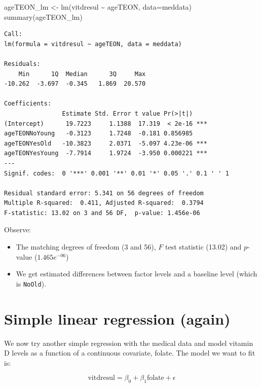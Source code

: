 \documentclass[
  oneside]{krantz}
\newenvironment{Shaded}{\begin{snugshade}}{\end{snugshade}}
\newcommand{\AttributeTok}[1]{\textcolor[rgb]{0.77,0.63,0.00}{#1}}
\newcommand{\FunctionTok}[1]{\textcolor[rgb]{0.00,0.00,0.00}{#1}}
\newcommand{\NormalTok}[1]{#1}
\newcommand{\OtherTok}[1]{\textcolor[rgb]{0.56,0.35,0.01}{#1}}
\newcommand{\SpecialCharTok}[1]{\textcolor[rgb]{0.00,0.00,0.00}{#1}}
\providecommand{\tightlist}{%
  \setlength{\itemsep}{0pt}\setlength{\parskip}{0pt}}
\begin{document}
\begin{Shaded}
\begin{Highlighting}[]
\NormalTok{ageTEON\_lm }\OtherTok{\textless{}{-}} \FunctionTok{lm}\NormalTok{(vitdresul }\SpecialCharTok{\textasciitilde{}}\NormalTok{ ageTEON, }\AttributeTok{data=}\NormalTok{meddata)}
\FunctionTok{summary}\NormalTok{(ageTEON\_lm)}
\end{Highlighting}
\end{Shaded}

\begin{verbatim}
Call:
lm(formula = vitdresul ~ ageTEON, data = meddata)

Residuals:
    Min      1Q  Median      3Q     Max 
-10.262  -3.697  -0.345   1.869  20.570 

Coefficients:
                Estimate Std. Error t value Pr(>|t|)    
(Intercept)      19.7223     1.1388  17.319  < 2e-16 ***
ageTEONNoYoung   -0.3123     1.7248  -0.181 0.856985    
ageTEONYesOld   -10.3823     2.0371  -5.097 4.23e-06 ***
ageTEONYesYoung  -7.7914     1.9724  -3.950 0.000221 ***
---
Signif. codes:  0 '***' 0.001 '**' 0.01 '*' 0.05 '.' 0.1 ' ' 1

Residual standard error: 5.341 on 56 degrees of freedom
Multiple R-squared:  0.411, Adjusted R-squared:  0.3794 
F-statistic: 13.02 on 3 and 56 DF,  p-value: 1.456e-06
\end{verbatim}

Observe:

\begin{itemize}
\tightlist
\item
  The matching degrees of freedom (3 and 56), \(F\) test statistic (13.02) and \(p\)-value (\(1.465e^{-06}\))
\item
  We get estimated differences between factor levels and a baseline level (which is \texttt{NoOld}).
\end{itemize}

\hypertarget{simple-linear-regression-again}{%
\section{Simple linear regression (again)}\label{simple-linear-regression-again}}

We now try another simple regression with the medical data and model vitamin D levels as a function of a continuous covariate, folate. The model we want to fit is:

\[\textrm{vitdresul} = \beta_0 + \beta_1\textrm{folate} + \epsilon\]
\end{document}
